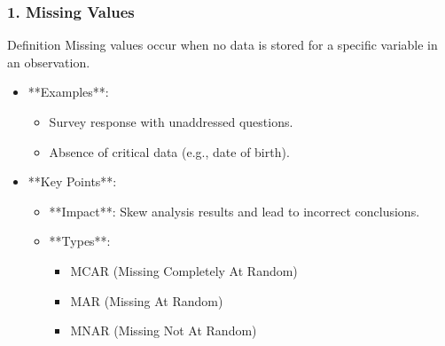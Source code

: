 \documentclass[aspectratio=169]{beamer}
\begin{document}
\begin{frame}[fragile]
    \frametitle{1. Missing Values}
    \begin{block}{Definition}
        Missing values occur when no data is stored for a specific variable in an observation.
    \end{block}
    
    \begin{itemize}
        \item **Examples**:
        \begin{itemize}
            \item Survey response with unaddressed questions.
            \item Absence of critical data (e.g., date of birth).
        \end{itemize}
        
        \item **Key Points**:
        \begin{itemize}
            \item **Impact**: Skew analysis results and lead to incorrect conclusions.
            \item **Types**:
            \begin{itemize}
                \item MCAR (Missing Completely At Random)
                \item MAR (Missing At Random)
                \item MNAR (Missing Not At Random)
            \end{itemize}
        \end{itemize}
    \end{itemize}
\end{frame}
\end{document}
